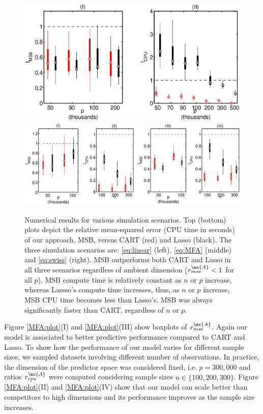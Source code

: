 \begin{figure}[h!]
\centering
 \vskip -0pt 
\includegraphics[width=.6\linewidth]{../figs/experiment1.eps} 
\includegraphics[width=0.8\linewidth]{../figs/nonlinear.eps} 

 \vskip -10pt 

\caption{Numerical results for various simulation scenarios.  Top (bottom) plots depict the relative mean-squared error (CPU time in seconds) of our approach, MSB, versus CART (red) and Lasso (black).  The three simulation scenarios are: \eqref{eq:linear} (left), \eqref{eq:MFA} (middle) and \eqref{eq:swiss} (right). MSB outperforms both CART and Lasso in all three scenarios regardless of ambient dimension ($r_{mse}^{\mc{A}}< 1$ for all $p$).  MSB compute time is relatively constant as $n$ or $p$ increase, whereas Lassso's compute time increases, thus, as $n$ or $p$ increase, MSB CPU time becomes less than Lasso's.  MSB was always significantly faster than CART, regardless of $n$ or $p$.} 
\label{fig:boxplots}
\end{figure}

 
Figure \ref{MFA:plot}(I) and  \ref{MFA:plot}(III)  show boxplots of $r_{mse}^{\mc{A}}$.  Again our model is associated to better predictive performance compared to CART and Lasso. To show how the performance of our model varies for different sample sizes,  we sampled datasets involving different number of observations. In practice, the dimension of the predictor space was considered fixed, i.e. $p=300,000$ and ratios $r^{\mc{A}}_{cpu}$ were computed considering sample sizes $n \in \{100,200,300 \}$. Figure \ref{MFA:plot}(II) and  \ref{MFA:plot}(IV) show that our model can scale better than competitors to high dimensions and its performance improves as the sample size increases. 




